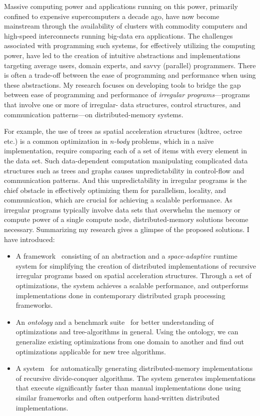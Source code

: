 Massive computing power and applications running on this power, primarily confined to expensive supercomputers a decade ago, have now become mainstream through the availability of clusters with commodity computers and high-speed interconnects running big-data era applications. 
The challenges associated with programming such systems, for effectively utilizing the computing power, have led to the creation of intuitive abstractions and implementations targeting average users, domain experts, and savvy (parallel) programmers. 
There is often a trade-off between the ease of programming and performance when using these abstractions. 
My research focuses on developing tools to bridge the gap between ease of programming and performance of {\em irregular programs}---programs that involve one or more of irregular- data structures, control structures, and communication patterns---on distributed-memory systems. 

For example, the use of trees as spatial acceleration structures (kdtree, octree etc.) is a common optimization in {\em n-body} problems, which in a na\"ive implementation, require comparing each of a set of items with every element in the data set. 
Such data-dependent computation manipulating complicated data structures such as trees and graphs causes unpredictability in control-flow and communication patterns. 
And this unpredictability in irregular programs is the chief obstacle in effectively optimizing them for parallelism, locality, and communication, which are crucial for achieving a scalable performance. 
As irregular programs typically involve data sets that overwhelm the memory or compute power of a single compute node, distributed-memory solutions become necessary. 
Summarizing my research gives a glimpse of the proposed solutions. I have introduced:
\begin{itemize}
\item A framework~\cite{hegde17ics} consisting of an abstraction and a {\em space-adaptive} runtime system for simplifying the creation of distributed implementations of recursive irregular programs based on spatial acceleration structures. Through a set of optimizations, the system achieves a scalable performance, and outperforms implementations done in contemporary distributed graph processing frameworks.
\item An {\em ontology} and a benchmark suite~\cite{hegde17ispass} for better understanding of optimizations and tree-algorithms in general. Using the ontology, we can generalize existing optimizations from one domain to another and find out optimizations applicable for new tree algorithms.
\item A system~\cite{hegde19d2p} for automatically generating distributed-memory implementations of recursive divide-conquer algorithms. The system generates implementations that execute significantly faster than manual implementations done using similar frameworks and often outperform hand-written distributed implementations.
\end{itemize} 
 
